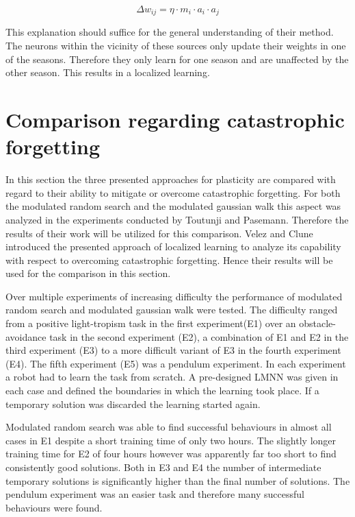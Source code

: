 \documentclass[12pt,twoside]{scrartcl}
\theoremstyle{plain}
\theoremstyle{definition}
\theoremstyle{remark}
\begin{document}
\[
    \Delta w_{ij} = \eta \cdot m_i \cdot a_i \cdot a_j
\]

This explanation should suffice for the general understanding of their method.
The neurons within the vicinity of these sources only update their weights
in one of the seasons. Therefore they only learn for one season and are unaffected
by the other season. This results in a localized learning.

\section{Comparison regarding catastrophic forgetting}
\label{sec:comparison}

In this section the three presented approaches for plasticity are compared with
regard to their ability to mitigate or overcome catastrophic forgetting. For both
the modulated random search and the modulated gaussian walk this aspect was
analyzed in the experiments conducted by Toutunji and Pasemann\cite{Toutounji2016}.
Therefore the results of their work will be utilized for this comparison.
Velez and Clune\cite{Velez2017} introduced the presented approach of localized
learning to analyze its capability with respect to overcoming catastrophic
forgetting. Hence their results will be used for the comparison in this section.

Over multiple experiments of increasing difficulty the performance of modulated
random search and modulated gaussian walk were tested. The difficulty ranged
from a positive light-tropism task in the first experiment(E1) over an
obstacle-avoidance task in the second experiment (E2), a combination of E1 and E2
in the third experiment (E3) to a more difficult variant of E3 in the fourth
experiment (E4). The fifth experiment (E5) was a pendulum experiment.
In each experiment a robot had to learn the task from scratch. A pre-designed
LMNN was given in each case and defined the boundaries in which the learning
took place. If a temporary solution was discarded the learning started again.

Modulated random search was able to find successful behaviours in almost all
cases in E1 despite a short training time of only two hours. The slightly
longer training time for E2 of four hours however was apparently far too short
to find consistently good solutions. Both in E3 and E4 the number of intermediate
temporary solutions is significantly higher than the final number of solutions.
The pendulum experiment was an easier task and therefore many successful
behaviours were found.
\end{document}
